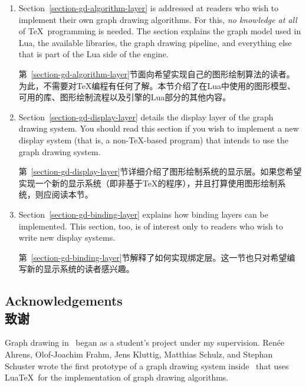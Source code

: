 \begin{enumerate}
        接下来的章节详细介绍了当前作为\tikzname 发行版一部分实现的图形绘制算法，参见第~\ref{section-first-graphdrawing-library-in-manual}节到第~\ref{section-last-graphdrawing-library-in-manual}节。


    \item Section~\ref{section-gd-algorithm-layer} is addressed at readers who
        wish to implement their own graph drawing algorithms. For this,
        \emph{no knowledge at all} of \TeX\ programming is needed. The section
        explains the graph model used in Lua, the available libraries, the
        graph drawing pipeline, and everything else that is part of the Lua
        side of the engine.

        第~\ref{section-gd-algorithm-layer}节面向希望实现自己的图形绘制算法的读者。为此，不需要对\TeX 编程有任何了解。本节介绍了在Lua中使用的图形模型、可用的库、图形绘制流程以及引擎的Lua部分的其他内容。


    \item Section~\ref{section-gd-display-layer} details the display layer of
        the graph drawing system. You should read this section if you wish to
        implement a new display system (that is, a non-\TeX-based program) that
        intends to use the graph drawing system.

        第~\ref{section-gd-display-layer}节详细介绍了图形绘制系统的显示层。如果您希望实现一个新的显示系统（即非基于\TeX 的程序），并且打算使用图形绘制系统，则应阅读本节。


    \item Section~\ref{section-gd-binding-layer} explains how binding layers
        can be implemented. This section, too, is of interest only to readers
        who wish to write new display systems.

        第~\ref{section-gd-binding-layer}节解释了如何实现绑定层。这一节也只对希望编写新的显示系统的读者感兴趣。


\end{enumerate}


\subsection{Acknowledgements\\致谢}

Graph drawing in \tikzname\ began as a student's project under my supervision.
Ren\'ee Ahrens, Olof-Joachim Frahm, Jens Kluttig, Matthias Schulz, and Stephan
Schuster wrote the first prototype of a graph drawing system inside \tikzname\
that uses Lua\TeX\ for the implementation of graph drawing algorithms.

